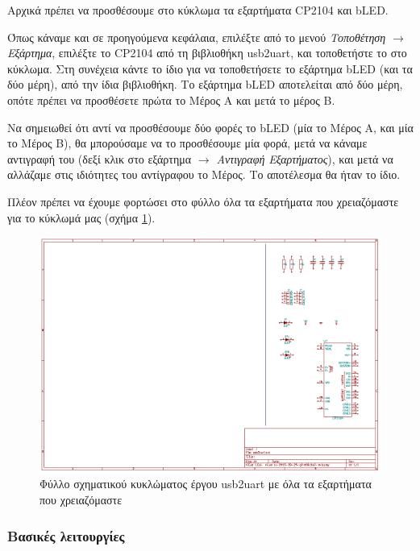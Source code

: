 \documentclass[a4paper]{article}
\begin{document}
Αρχικά πρέπει να προσθέσουμε στο κύκλωμα τα εξαρτήματα CP2104 και bLED. 

Όπως κάναμε και σε προηγούμενα κεφάλαια, επιλέξτε από το μενού \textit{Τοποθέτηση $\rightarrow$ Εξάρτημα}, επιλέξτε το CP2104 από τη βιβλιοθήκη usb2uart, και τοποθετήστε το στο κύκλωμα. Στη συνέχεια κάντε το ίδιο για να τοποθετήσετε το εξάρτημα bLED (και τα δύο μέρη), από την ίδια βιβλιοθήκη. Το εξάρτημα bLED αποτελείται από δύο μέρη, οπότε πρέπει να προσθέσετε πρώτα το Μέρος Α και μετά το μέρος Β.

Να σημειωθεί ότι αντί να προσθέσουμε δύο φορές το bLED (μία το Μέρος Α, και μία το Μέρος Β), θα μπορούσαμε να το προσθέσουμε μία φορά, μετά να κάναμε αντιγραφή του (δεξί κλικ στο εξάρτημα \textit{$\rightarrow$ Αντιγραφή Εξαρτήματος}), και μετά να αλλάζαμε στις ιδιότητες του αντίγραφου το Μέρος. Το αποτέλεσμα θα ήταν το ίδιο.

Πλέον πρέπει να έχουμε φορτώσει στο φύλλο όλα τα εξαρτήματα που χρειαζόμαστε για το κύκλωμά μας (σχήμα \ref{fig:eesch-circ-allcomp}).

\begin{figure}
  \begin{center}
    \includegraphics[width=.9\textwidth]{img/eesch-circ-allcomp.png}
    \caption{Φύλλο σχηματικού κυκλώματος έργου usb2uart με όλα τα εξαρτήματα που χρειαζόμαστε}
    \label{fig:eesch-circ-allcomp}
  \end{center}
\end{figure}


\subsubsection{Βασικές λειτουργίες}
\end{document}
